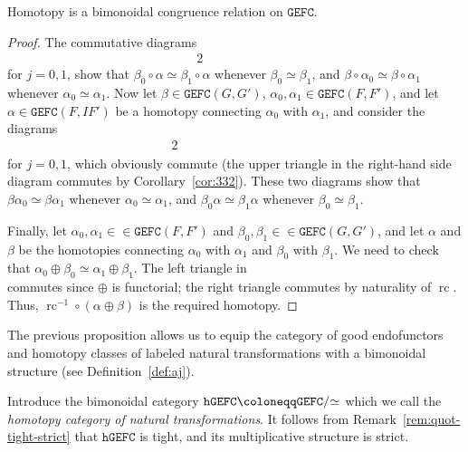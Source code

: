 \documentclass[10pt]{simplearticle}
\newcommand{\tikzinput}[1]{}
\newcommand{\GEFC}{\mathbb{\mathtt{GEFC}}}
\newcommand{\hGEFC}{\mathtt{hGEFC}}
\newcommand{\rc}{\operatorname{rc}}
\newcommand{\modrel}[1]{/\hspace{-0.6ex}#1\hspace{0.1ex}}
\begin{document}
\begin{prop}\label{prop:homot-bimon-congr}
Homotopy is a bimonoidal congruence
relation on $\GEFC$.
\end{prop}

\begin{proof}
The commutative diagrams
\begin{alignat*}{2}
\tikzinput{d196} & \qquad\qquad & \tikzinput{d199}
\end{alignat*}
for $j=0,1$, show that $\beta_{0}\circ\alpha\simeq\beta_{1}\circ\alpha$
whenever $\beta_{0}\simeq\beta_{1}$, and $\beta\circ\alpha_{0}\simeq\beta\circ\alpha_{1}$
whenever $\alpha_{0}\simeq\alpha_{1}$.
Now let $\beta\in\GEFC(G,G')$, $\alpha_{0},\alpha_{1}\in\GEFC(F,F')$,
and let $\alpha\in\GEFC(F,IF')$ be a homotopy connecting $\alpha_{0}$
with $\alpha_{1}$, and consider the diagrams
\begin{alignat*}{2}
\phantom{j=1,2} & \tikzinput{d222} & \qquad\qquad & \tikzinput{d223}
\end{alignat*}
for $j=0,1$, which obviously commute (the upper triangle in the right-hand
side diagram commutes by Corollary~\ref{cor:332}). These two diagrams
show that $\beta\alpha_{0}\simeq\beta\alpha_{1}$ whenever $\alpha_{0}\simeq\alpha_{1}$,
and $\beta_{0}\alpha\simeq\beta_{1}\alpha$ whenever $\beta_{0}\simeq\beta_{1}$.

Finally, let $\alpha_{0},\alpha_{1}\in\in\GEFC(F,F')$ and $\beta_{0},\beta_{1}\in\in\GEFC(G,G')$,
and let $\alpha$ and $\beta$ be the homotopies connecting $\alpha_{0}$
with $\alpha_{1}$ and $\beta_{0}$ with $\beta_{1}$. We need to
check that $\alpha_{0}\oplus\beta_{0}\simeq\alpha_{1}\oplus\beta_{1}$.
The left triangle in
\[
\tikzinput{d288}
\]
commutes since $\oplus$ is functorial; the right triangle commutes
by naturality
of $\rc$. Thus, $\rc^{-1}\circ(\alpha\oplus\beta)$
is the required homotopy.
\end{proof}

The previous proposition allows us to equip the category of good endofunctors
and homotopy classes of labeled natural transformations with a bimonoidal
structure (see Definition~\ref{def:aj}).

\begin{defn}
Introduce the bimonoidal category $\hGEFC\coloneqq\GEFC\modrel{\simeq}$
which we call the \emph{homotopy category of natural transformations}.
It follows from Remark~\ref{rem:quot-tight-strict} that $\hGEFC$
is tight, and its multiplicative structure is strict.
\end{defn}
\end{document}
